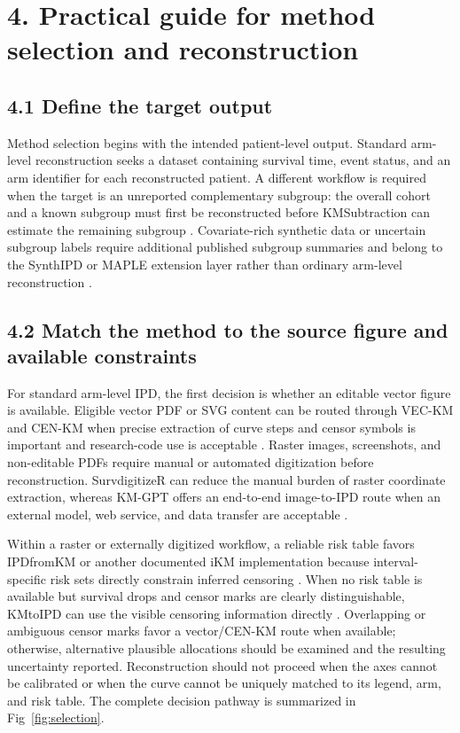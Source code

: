 \documentclass[10pt,letterpaper]{article}
\begin{document}
\section*{4. Practical guide for method selection and reconstruction}

\subsection*{4.1 Define the target output}

Method selection begins with the intended patient-level output. Standard arm-level reconstruction seeks a dataset containing survival time, event status, and an arm identifier for each reconstructed patient. A different workflow is required when the target is an unreported complementary subgroup: the overall cohort and a known subgroup must first be reconstructed before KMSubtraction can estimate the remaining subgroup \cite{zhao2022}. Covariate-rich synthetic data or uncertain subgroup labels require additional published subgroup summaries and belong to the SynthIPD or MAPLE extension layer rather than ordinary arm-level reconstruction \cite{synthipd2026,resolve2026}.

\subsection*{4.2 Match the method to the source figure and available constraints}

For standard arm-level IPD, the first decision is whether an editable vector figure is available. Eligible vector PDF or SVG content can be routed through VEC-KM and CEN-KM when precise extraction of curve steps and censor symbols is important and research-code use is acceptable \cite{resolve2026}. Raster images, screenshots, and non-editable PDFs require manual or automated digitization before reconstruction. SurvdigitizeR can reduce the manual burden of raster coordinate extraction, whereas KM-GPT offers an end-to-end image-to-IPD route when an external model, web service, and data transfer are acceptable \cite{zhang2024,kmgpt2025}.

Within a raster or externally digitized workflow, a reliable risk table favors IPDfromKM or another documented iKM implementation because interval-specific risk sets directly constrain inferred censoring \cite{guyot2012,liu2021}. When no risk table is available but survival drops and censor marks are clearly distinguishable, KMtoIPD can use the visible censoring information directly \cite{rogula2022}. Overlapping or ambiguous censor marks favor a vector/CEN-KM route when available; otherwise, alternative plausible allocations should be examined and the resulting uncertainty reported. Reconstruction should not proceed when the axes cannot be calibrated or when the curve cannot be uniquely matched to its legend, arm, and risk table. The complete decision pathway is summarized in Fig~\ref{fig:selection}.
\end{document}
